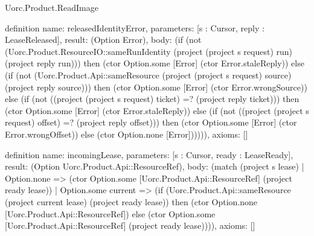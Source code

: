 \begin{lexlean}{Uorc.Product.ReadImage}
\begin{semanticmodule}
definition{
  name: releasedIdentityError,
  parameters: [s : Cursor, reply : LeaseReleased],
  result: (Option Error),
  body: (if (not (Uorc.Product.ResourceIO::sameRunIdentity (project (project s request) run) (project reply run))) then (ctor Option.some [Error] (ctor Error.staleReply)) else (if (not (Uorc.Product.Api::sameResource (project (project s request) source) (project reply source))) then (ctor Option.some [Error] (ctor Error.wrongSource)) else (if (not ((project (project s request) ticket) =? (project reply ticket))) then (ctor Option.some [Error] (ctor Error.staleReply)) else (if (not ((project (project s request) offset) =? (project reply offset))) then (ctor Option.some [Error] (ctor Error.wrongOffset)) else (ctor Option.none [Error]))))),
  axioms: []
}

definition{
  name: incomingLease,
  parameters: [s : Cursor, ready : LeaseReady],
  result: (Option Uorc.Product.Api::ResourceRef),
  body: (match (project s lease)
    | Option.none => (ctor Option.some [Uorc.Product.Api::ResourceRef] (project ready lease))
    | Option.some current => (if (Uorc.Product.Api::sameResource (project current lease) (project ready lease)) then (ctor Option.none [Uorc.Product.Api::ResourceRef]) else (ctor Option.some [Uorc.Product.Api::ResourceRef] (project ready lease)))),
  axioms: []
}


\end{semanticmodule}
\end{lexlean}
